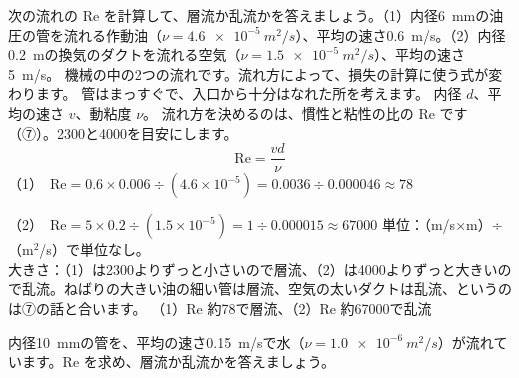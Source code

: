 \begin{phreidai}\label{ph:力-14:ex2}
次の流れの Re を計算して、層流か乱流かを答えましょう。（1）内径\qty{6}{mm}の油圧の管を流れる作動油（$\nu=\qty{4.6e-5}{m^2/s}$）、平均の速さ\qty{0.6}{m/s}。（2）内径\qty{0.2}{m}の換気のダクトを流れる空気（$\nu=\qty{1.5e-5}{m^2/s}$）、平均の速さ\qty{5}{m/s}。
\phbamen
機械の中の2つの流れです。流れ方によって、損失の計算に使う式が変わります。
\phmushi
管はまっすぐで、入口から十分はなれた所を考えます。
\phzu
内径 $d$、平均の速さ $v$、動粘度 $\nu$。
\phriyu
流れ方を決めるのは、慣性と粘性の比の Re です（⑦）。2300と4000を目安にします。
\phtateru
\[\mathrm{Re}=\frac{vd}{\nu}\]
\phtoku
（1）\nobreak\ $\mathrm{Re}=0.6\times0.006\div (4.6\times10^{-5})=0.0036\div 0.000046\approx78$\par
（2）\nobreak\ $\mathrm{Re}=5\times0.2\div (1.5\times10^{-5})=1\div 0.000015\approx\num{67000}$
\phtashikame
単位：（m/s×m）÷（m$^2$/s）で単位なし。\\
大きさ：（1）は2300よりずっと小さいので層流、（2）は4000よりずっと大きいので乱流。ねばりの大きい油の細い管は層流、空気の太いダクトは乱流、というのは⑦の話と合います。
\kotae （1）Re 約78で層流、（2）Re 約\num{67000}で乱流
\end{phreidai}
\begin{jibun}
内径\qty{10}{mm}の管を、平均の速さ\qty{0.15}{m/s}で水（$\nu=\qty{1.0e-6}{m^2/s}$）が流れています。Re を求め、層流か乱流かを答えましょう。
\end{jibun}

